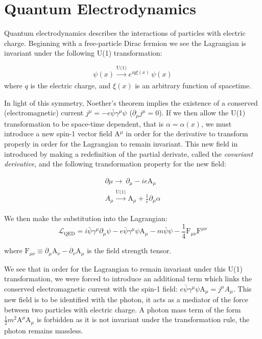 \section{Quantum Electrodynamics}

Quantum electrodynamics describes the interactions of particles with electric charge. Beginning with a free-particle Dirac fermion we see the Lagrangian is invariant under the following U(1) transformation:

\begin{equation}
\psi(x)  \xrightarrow[]{\text{U(1)}} e^{i q \xi(x)}\,\psi(x)
\label{eq:u1}
\end{equation}
where $q$ is the electric charge, and $\xi(x)$ is an arbitrary function of spacetime.

In light of this symmetry, Noether's theorem implies the existence of a conserved (electromagnetic) current $j^{\mu} = -e\bar{\psi}\gamma^{\mu}\psi$ ($\partial_{\mu}j^{\mu}=0$). If we then allow the U(1) transformation to be space-time dependent, that is $\alpha = \alpha(x)$, we must introduce a new spin-1 vector field A$^{\mu}$ in order for the derivative to transform properly in order for the Lagrangian to remain invariant. This new field in introduced by making a redefinition of the partial derivate, called the \textit{covariant derivative}, and the following transformation property for the new field:

\begin{equation}
\begin{array}{l}
\partial{\mu} \rightarrow\ \partial_{\mu} - ie\mathrm{A}_{\mu}
\\A_{\mu} \xrightarrow[]{\text{U(1)}} \mathrm{A}_{\mu} + \frac{1}{e} \partial_{\mu} \alpha
 \end{array}
\end{equation}

We then make the substitution into the Lagrangian:
\begin{equation}
\mathcal{L}_{\mathrm{QED}} =
i\bar{\psi}\gamma^{\mu}\partial_{\mu}\psi
- e\bar{\psi}\gamma^{\mu}\psi \mathrm{A}_{\mu}
- m\bar{\psi}\psi
- \frac{1}{4}\mathrm{F}_{\mu\nu} \mathrm{F}^{\mu\nu}
\end{equation}

where $\mathrm{F}_{\mu\nu}\equiv\partial_{\mu}\mathrm{A}_{\nu} - \partial_{\nu}\mathrm{A}_{\mu}$ is the field strength tensor.

We see that in order for the Lagrangian to remain invariant under this U(1) transformation, we were forced to introduce an additional term which links the conserved electromagnetic current with the spin-1 field: $e\bar{\psi}\gamma^{\mu}\psi \mathrm{A}_{\mu} = j^{\mu}A_{\mu}$. This new field is to be identified with the photon,  it acts as a mediator of the force between two particles with electric charge. A photon mass term of the form $\frac{1}{2}m^{2}\mathrm{A}^{\mu}\mathrm{A}_{\mu}$ is forbidden as it is not invariant under the transformation rule, the photon remains massless.


